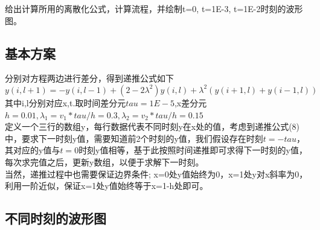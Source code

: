 \documentclass[11pt]{ctexart}
\begin{document}
给出计算所用的离散化公式，计算流程，并绘制t=0, t=1E-3, t=1E-2时刻的波形图。

\subsection{基本方案}

分别对方程两边进行差分，得到递推公式如下
\begin{equation}
y(i,l+1)=-y(i,l-1)+(2-2\lambda^{2})y(i,l)+\lambda^{2}(y(i+1,l)+y(i-1,l))
\end{equation}
\indent 其中i,l分别对应x,t.取时间差分元$tau=1E-5$,x差分元$h=0.01,\lambda_{1}=v_{1}*tau/h=0.3,\lambda_{2}=v_{2}*tau/h=0.15$ \\
\indent 定义一个三行的数组y，每行数据代表不同时刻y在x处的值，考虑到递推公式(8)中，要求下一时刻y值，需要知道前2个时刻的y值，我们假设存在时刻$t=-tau$，其对应的y值与$t=0$时刻y值相等，基于此按照时间递推即可求得下一时刻的y值，每次求完值之后，更新y数组，以便于求解下一时刻。\\
\indent 当然，递推过程中也需要保证边界条件; x=0处y值始终为0，x=1处y对x斜率为0，利用一阶近似，保证x=1处y值始终等于x=1-h处即可。

\subsection{不同时刻的波形图}
\end{document}
